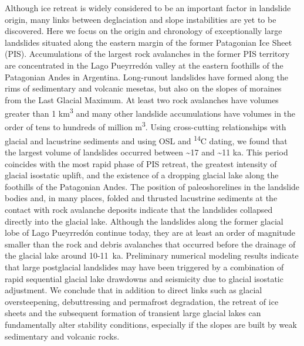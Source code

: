{Although ice retreat is widely considered to be an important factor in landslide origin, many links between deglaciation and slope instabilities are yet to be discovered. Here we focus on the origin and chronology of exceptionally large landslides situated along the eastern margin of the former Patagonian Ice Sheet (PIS). Accumulations of the largest rock avalanches in the former PIS territory are concentrated in the Lago Pueyrredón valley at the eastern foothills of the Patagonian Andes in Argentina. Long-runout landslides have formed along the rims of sedimentary and volcanic mesetas, but also on the slopes of moraines from the Last Glacial Maximum. At least two rock avalanches have volumes greater than 1 km\textsuperscript{3} and many other landslide accumulations have volumes in the order of tens to hundreds of million m\textsuperscript{3}. Using cross-cutting relationships with glacial and lacustrine sediments and using OSL and \textsuperscript{14}C dating, we found that the largest volume of landslides occurred between \textasciitilde17 and \textasciitilde11 ka. This period coincides with the most rapid phase of PIS retreat, the greatest intensity of glacial isostatic uplift, and the existence of a dropping glacial lake along the foothills of the Patagonian Andes. The position of paleoshorelines in the landslide bodies and, in many places, folded and thrusted lacustrine sediments at the contact with rock avalanche deposits indicate that the landslides collapsed directly into the glacial lake. Although the landslides along the former glacial lobe of Lago Pueyrredón continue today, they are at least an order of magnitude smaller than the rock and debris avalanches that occurred before the drainage of the glacial lake around 10-11~ka. Preliminary numerical modeling results indicate that large postglacial landslides may have been triggered by a combination of rapid sequential glacial lake drawdowns and seismicity due to glacial isostatic adjustment. We conclude that in addition to direct links such as glacial oversteepening, debuttressing and permafrost degradation, the retreat of ice sheets and the subsequent formation of transient large glacial lakes can fundamentally alter stability conditions, especially if the slopes are built by weak sedimentary and volcanic rocks.}%
{}%

